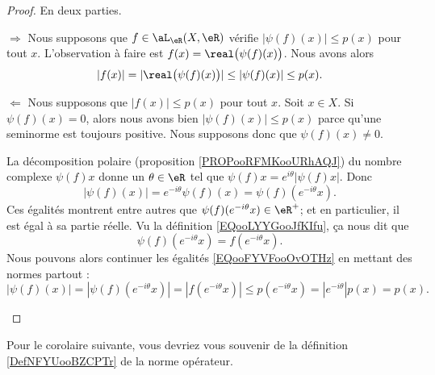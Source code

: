 \begin{proof}
    En deux parties.
    \begin{subproof}
    \item[\( \Rightarrow\)]
        Nous supposons que \( f\in \aL_{\eR}(X,\eR)\) vérifie \( | \psi(f)(x) |\leq p(x)\) pour tout \( x\). L'observation à faire est \( f(x)=\real\big( \psi(f)(x) \big)\). Nous avons alors
        \begin{equation}
            | f(x) |=| \real\big( \psi(f)(x) \big) |\leq | \psi(f)(x) |\leq p(x).
        \end{equation}
    \item[\( \Leftarrow\)]
        Nous supposons que \( | f(x) |\leq p(x)\) pour tout \( x\). Soit \( x\in X\). Si \( \psi(f)(x)=0\), alors nous avons bien \( | \psi(f)(x) |\leq p(x)\) parce qu'une seminorme est toujours positive. Nous supposons donc que \( \psi(f)(x)\neq 0\).

        La décomposition polaire (proposition \ref{PROPooRFMKooURhAQJ}) du nombre complexe \( \psi(f)x\) donne un \( \theta\in \eR\) tel que $\psi(f)x= e^{i\theta}| \psi(f)x |$. Donc
        \begin{equation}        \label{EQooFYVFooOvOTHz}
            | \psi(f)(x) |= e^{-i\theta}\psi(f)(x)=\psi(f)( e^{-i\theta}x).
        \end{equation}
        Ces égalités montrent entre autres que \( \psi(f)( e^{-i\theta}x)\in \eR^+\); et en particulier, il est égal à sa partie réelle. Vu la définition \eqref{EQooLYYGooJfKIfu}, ça nous dit que
        \begin{equation}
            \psi(f)( e^{-i\theta}x)=f( e^{-i\theta}x).
        \end{equation}
        Nous pouvons alors continuer les égalités \eqref{EQooFYVFooOvOTHz} en mettant des normes partout :
        \begin{equation}
            | \psi(f)(x) |=| \psi(f)( e^{-i\theta}x) |=| f( e^{-i\theta}x) |\leq p( e^{-i\theta}x)=|  e^{-i\theta} |p(x)=p(x).
        \end{equation}
    \end{subproof}
\end{proof}

Pour le corolaire suivante, vous devriez vous souvenir de la définition \ref{DefNFYUooBZCPTr} de la norme opérateur.

